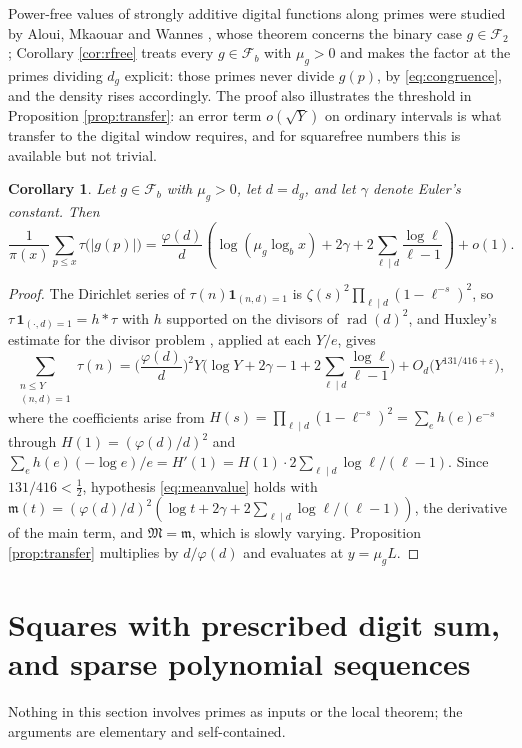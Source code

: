 \documentclass[11pt,reqno]{amsart}
\theoremstyle{plain}
\newtheorem{corollary}[theorem]{Corollary}
\theoremstyle{definition}
\DeclareMathOperator{\rad}{rad}
\begin{document}
Power-free values of strongly additive digital functions along primes were studied by Aloui, Mkaouar and Wannes \cite{aloui}, whose theorem concerns the binary case $g\in\mathcal F_2$; Corollary \ref{cor:rfree} treats every $g\in\mathcal F_b$ with $\mu_g>0$ and makes the factor at the primes dividing $d_g$ explicit: those primes never divide $g(p)$, by \eqref{eq:congruence}, and the density rises accordingly. The proof also illustrates the threshold in Proposition \ref{prop:transfer}: an error term $o(\sqrt Y)$ on ordinary intervals is what transfer to the digital window requires, and for squarefree numbers this is available but not trivial.

\begin{corollary}\label{cor:tau}
Let $g\in\mathcal F_b$ with $\mu_g>0$, let $d=d_g$, and let $\gamma$ denote Euler's constant. Then
\[
\frac1{\pi(x)}\sum_{p\le x}\tau\big(|g(p)|\big)
=\frac{\varphi(d)}d\left(\log(\mu_g\log_bx)+2\gamma+2\sum_{\ell\mid d}\frac{\log\ell}{\ell-1}\right)+o(1).
\]
\end{corollary}

\begin{proof}
The Dirichlet series of $\tau(n)\mathbf 1_{(n,d)=1}$ is $\zeta(s)^{2}\prod_{\ell\mid d}(1-\ell^{-s})^{2}$, so $\tau\,\mathbf 1_{(\cdot,d)=1}=h*\tau$ with $h$ supported on the divisors of $\rad(d)^{2}$, and Huxley's estimate for the divisor problem \cite{huxley}, applied at each $Y/e$, gives
\[
\sum_{\substack{n\le Y\\ (n,d)=1}}\tau(n)
=\Big(\frac{\varphi(d)}d\Big)^{2}Y\Big(\log Y+2\gamma-1+2\sum_{\ell\mid d}\frac{\log\ell}{\ell-1}\Big)
+O_d\big(Y^{131/416+\varepsilon}\big),
\]
where the coefficients arise from $H(s)=\prod_{\ell\mid d}(1-\ell^{-s})^{2}=\sum_eh(e)e^{-s}$ through $H(1)=(\varphi(d)/d)^{2}$ and $\sum_eh(e)(-\log e)/e=H'(1)=H(1)\cdot2\sum_{\ell\mid d}\log\ell/(\ell-1)$. Since $131/416<\tfrac12$, hypothesis \eqref{eq:meanvalue} holds with $\mathfrak m(t)=(\varphi(d)/d)^{2}(\log t+2\gamma+2\sum_{\ell\mid d}\log\ell/(\ell-1))$, the derivative of the main term, and $\mathfrak M=\mathfrak m$, which is slowly varying. Proposition \ref{prop:transfer} multiplies by $d/\varphi(d)$ and evaluates at $y=\mu_gL$.
\end{proof}
\section{Squares with prescribed digit sum, and sparse polynomial sequences}\label{sec:squares}

Nothing in this section involves primes as inputs or the local theorem; the arguments are elementary and self-contained.
\end{document}
